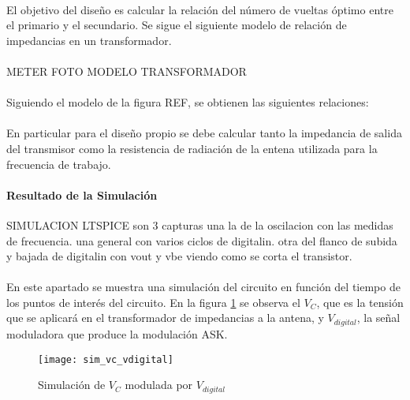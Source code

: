 \paragraph{}
El objetivo del diseño es calcular la relación del número de vueltas óptimo entre el primario y el secundario. Se sigue el siguiente modelo de relación de impedancias en un transformador.
\paragraph{}
METER FOTO MODELO TRANSFORMADOR
\paragraph{}
Siguiendo el modelo de la figura REF, se obtienen las siguientes relaciones:
\paragraph{}
En particular para el diseño propio se debe calcular tanto la impedancia de salida del transmisor como la resistencia de radiación de la entena utilizada para la frecuencia de trabajo.


\paragraph{Resultado de la Simulaci\'on} SIMULACION LTSPICE
son 3 capturas una la de la oscilacion con las medidas de frecuencia.
una general con varios ciclos de digitalin.
otra del flanco de subida y bajada de digitalin con vout y vbe viendo como se corta el transistor.
\paragraph{}
En este apartado se muestra una simulación del circuito en función del tiempo de los puntos de interés del circuito. 
En la figura \ref{fig:sim_vc_vdig} se observa el $V_C$, que es la tensión que se aplicará en el transformador de impedancias a la antena, y $V_{digital}$, la señal moduladora que produce la modulación ASK. 
\begin{figure}[h]
    \centering
    \texttt{[image: sim\_vc\_vdigital]}
    \caption{Simulaci\'on de $V_C$ modulada por $V_{digital}$}
    \label{fig:sim_vc_vdig}
\end{figure}
